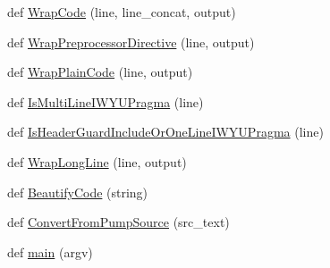 \begin{DoxyCompactItemize}
\item 
def \mbox{\hyperlink{namespacegoogletest_1_1scripts_1_1pump_a224bd856240f99990f0f9aaaf38302cd}{Wrap\+Code}} (line, line\+\_\+concat, output)
\item 
def \mbox{\hyperlink{namespacegoogletest_1_1scripts_1_1pump_aa562b4b01cbc8bc0cbe6ae79b19d25a2}{Wrap\+Preprocessor\+Directive}} (line, output)
\item 
def \mbox{\hyperlink{namespacegoogletest_1_1scripts_1_1pump_aa61f24be43b6f2cfd72b501f6cd6b86d}{Wrap\+Plain\+Code}} (line, output)
\item 
def \mbox{\hyperlink{namespacegoogletest_1_1scripts_1_1pump_ad5e1d2f62ae9a910da552b5ae973b668}{Is\+Multi\+Line\+I\+W\+Y\+U\+Pragma}} (line)
\item 
def \mbox{\hyperlink{namespacegoogletest_1_1scripts_1_1pump_a682135b6c619b01b1f3e5fdfab227950}{Is\+Header\+Guard\+Include\+Or\+One\+Line\+I\+W\+Y\+U\+Pragma}} (line)
\item 
def \mbox{\hyperlink{namespacegoogletest_1_1scripts_1_1pump_a96489330d7e204b9272f265faa4788b9}{Wrap\+Long\+Line}} (line, output)
\item 
def \mbox{\hyperlink{namespacegoogletest_1_1scripts_1_1pump_ad3452a9d016272f795c211b327349c9b}{Beautify\+Code}} (string)
\item 
def \mbox{\hyperlink{namespacegoogletest_1_1scripts_1_1pump_a9c55945634866ab4e8c1143909005b73}{Convert\+From\+Pump\+Source}} (src\+\_\+text)
\item 
def \mbox{\hyperlink{namespacegoogletest_1_1scripts_1_1pump_a05de322e2f9b2c7794247e613d8f6629}{main}} (argv)
\end{DoxyCompactItemize}
